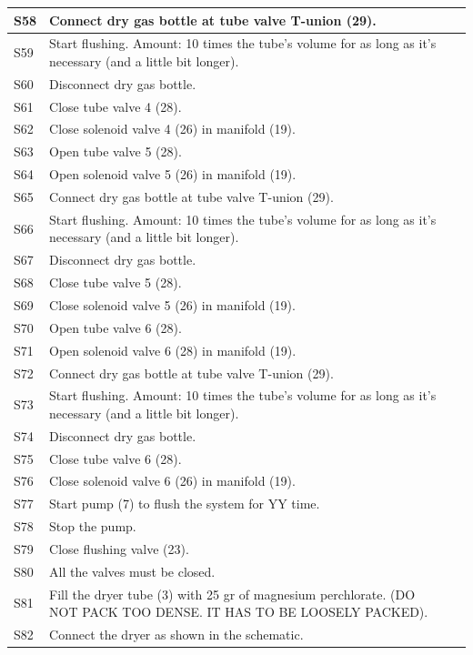 \documentclass[a4paper,12pt,twoside]{article}
\begin{document}
\begin{appendices}
\begin{longtable} {|m{}|m{}|m{}|}
\hline
S58 & Connect dry gas bottle at tube valve T-union (29). & \\
\hline
S59 & Start flushing. Amount: 10 times the tube's volume for as long as it's necessary (and a little bit longer). & \\
\hline
S60 & Disconnect dry gas bottle. & \\
\hline
S61 & Close tube valve 4 (28). & \\
\hline
S62 & Close solenoid valve 4 (26) in manifold (19). & \\
\hline
S63 & Open tube valve 5 (28). & \\
\hline
S64 & Open solenoid valve 5 (26) in manifold (19). & \\
\hline
S65 & Connect dry gas bottle at tube valve T-union (29). & \\
\hline
S66 & Start flushing. Amount: 10 times the tube's volume for as long as it's necessary (and a little bit longer). & \\
\hline
S67 & Disconnect dry gas bottle. & \\
\hline
S68 & Close tube valve 5 (28). & \\
\hline
S69 & Close solenoid valve 5 (26) in manifold (19). & \\
\hline
S70 & Open tube valve 6 (28). & \\
\hline
S71 & Open solenoid valve 6 (28) in manifold (19). & \\
\hline
S72 & Connect dry gas bottle at tube valve T-union (29). & \\
\hline
S73 & Start flushing. Amount: 10 times the tube's volume for as long as it's necessary (and a little bit longer). & \\
\hline
S74 & Disconnect dry gas bottle. & \\
\hline
S75 & Close tube valve 6 (28). & \\
\hline
S76 & Close solenoid valve 6 (26) in manifold (19). & \\
\hline
S77 & Start pump (7) to flush the system for YY time. & \\
\hline
S78 & Stop the pump. & \\
\hline
S79 & Close flushing valve (23). & \\
\hline
S80 & All the valves must be closed. & \\
\hline
S81 & Fill the dryer tube (3) with 25 gr of magnesium perchlorate. (DO NOT PACK TOO DENSE. IT HAS TO BE LOOSELY PACKED). & \\
\hline
S82 & Connect the dryer as shown in the schematic. & \\

\end{longtable}
\end{appendices}
\end{document}

